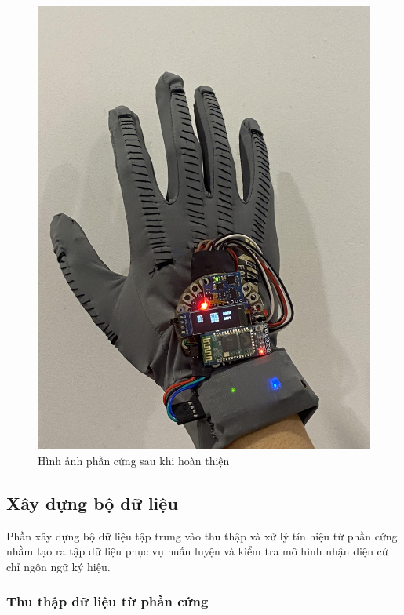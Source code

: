 \begin{figure}[H]
    \centering
    \includegraphics[width=\textwidth,height=\textheight,keepaspectratio]{Images/SystemImpl/full.jpg}
    \caption{Hình ảnh phần cứng sau khi hoàn thiện}
    \label{fig:enter-label}
\end{figure}

\subsection{Xây dựng bộ dữ liệu}

Phần xây dựng bộ dữ liệu tập trung vào thu thập và xử lý tín hiệu từ phần cứng nhằm tạo ra tập dữ liệu phục vụ huấn luyện và kiểm tra mô hình nhận diện cử chỉ ngôn ngữ ký hiệu.

\subsubsection{Thu thập dữ liệu từ phần cứng}

